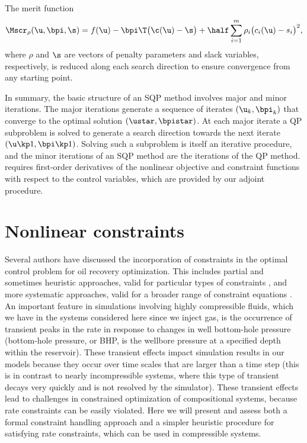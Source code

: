 The merit function 
\begin{equation}                              \label{eqn-def-merit}
        \Mscr_\rho(\u,\bpi,\s)
          = f(\u) - \bpi\T \bigl( \c(\u) - \s \bigr)
            + \half \sum_{i=1}^m \rho_i\big( c_i(\u) - s_i\big)^2,
\end{equation}
where $\rho$ and $\s$ are vectors of penalty parameters and slack variables, respectively, 
is reduced along each search
direction to ensure convergence from any starting point.

In summary, the basic structure of an SQP method involves major and
minor iterations.  The major iterations generate a sequence of
iterates $(\u_k,\bpi_k)$ that converge to the optimal solution $(\ustar,\bpistar)$.
At each major iterate a QP subproblem is solved to generate a search direction
towards the next iterate $(\u\kp1,\bpi\kp1)$.
Solving such a subproblem is itself an iterative procedure, and the minor iterations of an
SQP method are the iterations of the QP method.
\SNOPT{} requires first-order derivatives of the nonlinear
objective and constraint functions with respect to the control variables, which
are provided by our adjoint procedure.



\section{Nonlinear constraints} \label{sec:constraints} 
Several authors have discussed the incorporation of constraints in the optimal
control problem for oil recovery optimization. This includes partial and sometimes heuristic approaches, valid for particular types of constraints \cite{Brouwer:2004,VanEssen,Virnovski,Wang:2009}, and more systematic approaches, valid for a broader range of constraint equations \cite{Chen:2010,Montleau,Kraaijevanger,Pallav:2008,Suwartadi:2012}. An important feature in simulations involving highly compressible fluids, which we have in the systems considered here since we inject gas, is the occurrence of transient peaks in the rate in response to changes in well bottom-hole pressure (bottom-hole pressure, or BHP, is the wellbore pressure at a specified depth within the reservoir). These transient effects impact simulation results in our models because they occur over time scales that are larger than a time step (this is in contrast to nearly incompressible systems, where this type of transient decays very quickly and is not resolved by the simulator). These transient effects lead to challenges in constrained optimization of compositional systems, because rate constraints can be easily violated. Here we will present and assess both a formal constraint handling approach and a simpler heuristic procedure for satisfying rate constraints, which can be used in compressible systems.

